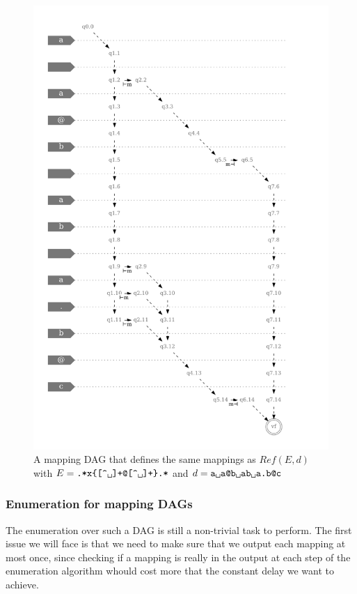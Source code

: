 \documentclass[11px]{article}
\theoremstyle{definition}
\begin{document}
        \begin{figure}
          \caption{%
            A mapping DAG that defines the same mappings as $Ref(E, d)$ with $E
            =
            \texttt{.*x\{[\textasciicircum\textvisiblespace]+@[\textasciicircum\textvisiblespace]+\}.*}$
            and $d =
            \texttt{a{\textvisiblespace}a@b{\textvisiblespace}ab{\textvisiblespace}a.b@c}$
          }
          \center\includegraphics[width=5in]{figures/example_dag}
        \end{figure}

      \subsubsection{Enumeration for mapping DAGs}

        The enumeration over such a DAG is still a non-trivial task to perform.
        The first issue we will face is that we need to make sure that we
        output each mapping at most once, since checking if a mapping is really
        in the output at each step of the enumeration algorithm whould cost
        more that the constant delay we want to achieve.
\end{document}
